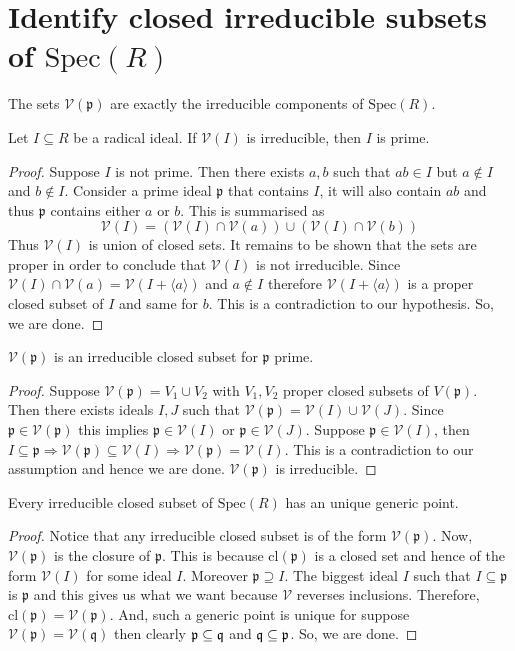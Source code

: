 \documentclass[oneside, 12pt]{scrbook}
\newcommand{\V}{\mathcal{V}}
\newcommand{\spec}{\mathrm{Spec}}
\newcommand{\pr}{\mathfrak{p}}
\theoremstyle{theorem}
\begin{document}
\section{Identify closed irreducible subsets of $\spec(R)$}

\begin{proposition}
The sets $\V(\pr)$ are exactly the irreducible components of $\spec(R)$.
\end{proposition}

\begin{lemma}
Let $I \subseteq R$ be a radical ideal. If $\V(I)$ is irreducible, then $I$ is prime.  
\end{lemma}

\begin{proof}
Suppose $I$ is not prime. Then there exists $a,b$ such that $ab \in I$ but $a\not \in I$ and $b \not \in I$. Consider a prime ideal $\pr$ that contains $I$, it will also contain $ab$ and thus $\pr$ contains either $a$ or $b$. This is summarised as $$\V(I) = (\V(I)\cap \V(a)) \cup (\V(I) \cap \V(b))$$ Thus $\V(I)$ is union of closed sets. It remains to be shown that the sets are proper in order to conclude that $\V(I)$ is not irreducible. Since $\V(I) \cap \V(a) = \V(I + \langle a \rangle)$ and $a \not \in I$ therefore $\V(I +\langle a \rangle)$ is a proper closed subset of $I$ and same for $b$. This is a contradiction to our hypothesis. So, we are done. 
\end{proof}

\begin{lemma}
$\V(\pr)$ is an irreducible closed subset for $\pr$ prime.
\end{lemma}

\begin{proof}
Suppose $\V(\pr) = V_{1} \cup V_{2}$ with $V_{1},V_{2}$ proper closed subsets of $V(\pr)$. Then there exists ideals $I,J$ such that $\V(\pr) = \V(I) \cup \V(J)$. Since $\pr \in \V(\pr)$ this implies $\pr \in \V(I)$ or $\pr \in \V(J)$. Suppose $\pr \in \V(I)$, then $I \subseteq \pr \Rightarrow \V(\pr) \subseteq \V(I) \Rightarrow \V(\pr) = \V(I)$. This is a contradiction to our assumption and hence we are done. $\V(\pr)$ is irreducible.
\end{proof}

\begin{proposition}
Every irreducible closed subset of $\spec(R)$ has an unique generic point.
\end{proposition}

\begin{proof}
Notice that any irreducible closed subset is of the form $\V(\pr)$. Now, $\V(\pr)$ is the closure of $\pr$. This is because $\mathrm{cl}(\pr)$ is a closed set and hence of the form $\V(I)$ for some ideal $I$. Moreover $\pr \supseteq I$. The biggest ideal $I$ such that $I \subseteq \pr$ is $\pr$ and this gives us what we want because $\V$ reverses inclusions. Therefore, $\mathrm{cl}(\pr) = \V(\pr)$. And, such a generic point is unique for suppose $\V(\pr) = \V(\mathfrak{q})$ then clearly $\pr \subseteq \frak{q}$ and $\frak{q} \subseteq \pr$. So, we are done. 
\end{proof}
\end{document}
